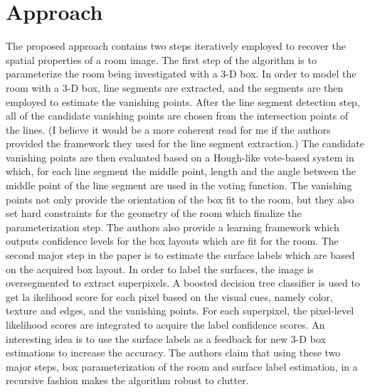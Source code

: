 \documentclass[11pt]{article}
\begin{document}
\section{Approach}
\indent The proposed approach contains two steps iteratively employed to recover the spatial properties of a room image.
The first step of the algorithm is to parameterize the room being investigated with a 3-D box.
In order to model the room with a 3-D box, line segments are extracted, and the segments are then employed to estimate the vanishing points.
After the line segment detection step, all of the candidate vanishing points are chosen from the intersection points of the lines.
(I believe it would be a more coherent read for me if the authors provided the framework they used for the line segment extraction.)
The candidate vanishing points are then evaluated based on a Hough-like vote-based system in which, for each line segment the middle point, length and the angle between the middle point of the line segment are used in the voting function.
The vanishing points not only provide the orientation of the box fit to the room, but they also set hard constraints for the geometry of the room which finalize the parameterization step.
The authors also provide a learning framework which outputs confidence levels for the box layouts which are fit for the room.
The second major step in the paper is to estimate the surface labels which are based on the acquired box layout.
In order to label the surfaces, the image is oversegmented to extract superpixels.
A boosted decision tree classifier is used to get la ikelihood score for each pixel based on the visual cues, namely color, texture and edges, and the vanishing points.
For each superpixel, the pixel-level likelihood scores are integrated to acquire the label confidence scores.
An interesting idea is to use the surface labels as a feedback for new 3-D box estimations to increase the accuracy.
The authors claim that using these two major steps, box parameterization of the room and surface label estimation, in a recursive fashion makes the algorithm robust to clutter.
\end{document}
